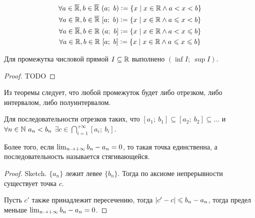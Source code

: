 \begin{gather}
    \forall a \in \overline{\mathbb{R}}, b \in \overline{\mathbb{R}}\ (a;\ b) \vcentcolon= \{x \;\vert\; x \in \mathbb{R} \land a < x < b \} \\
    \forall a \in \mathbb{R}, b \in \overline{\mathbb{R}}\ [a;\ b) \vcentcolon= \{x \;\vert\; x \in \mathbb{R} \land a \leqslant x < b \} \\
    \forall a \in \overline{\mathbb{R}}, b \in \mathbb{R}\ (a;\ b] \vcentcolon= \{x \;\vert\; x \in \mathbb{R} \land a < x \leqslant b \} \\
    \forall a \in \mathbb{R}, b \in \mathbb{R}\ [a;\ b] \vcentcolon= \{x \;\vert\; x \in \mathbb{R} \land a \leqslant x \leqslant b \}
\end{gather}

\begin{theorem}
    Для промежутка числовой прямой $I \subseteq \mathbb{R}$ выполнено $(\inf{I};\ \sup{I})$.
\end{theorem}
\begin{proof}
    TODO
\end{proof}

Из теоремы следует, что любой промежуток будет либо отрезком, либо интервалом, либо полуинтервалом.

\begin{theorem}
    Для последовательности отрезков таких, что $[a_1;\ b_1] \subseteq [a_2;\ b_2] \subseteq \ldots$ и $\forall n \in \mathbb{N}\ a_n < b_n$ $\exists c \in \bigcap_{i=1}^{+\infty} [a_i;\ b_i]$.

    Более того, если $\lim_{n\to+\infty} b_n - a_n =0$, то такая точка единственна, а последовательность называется стягивающейся.
\end{theorem}
\begin{proof}
    Sketch. $\{a_n\}$ лежит левее $\{b_n\}$. Тогда по аксиоме непрерывности существует точка $c$.

    Пусть $c'$ также принадлежит пересечению, тогда $\left\lvert c' - c \right\rvert \leqslant b_n - a_n$, тогда предел меньше $\lim_{n\to+\infty} b_n - a_n = 0$.
\end{proof}
